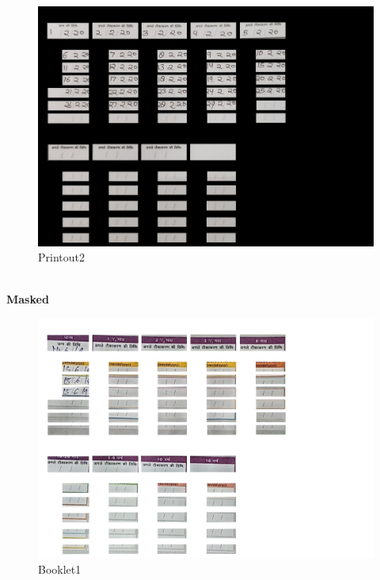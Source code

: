 \documentclass{article}
\begin{document}
    \begin{figure}[!htb]
    \minipage{\textwidth}
    \begin{center}
      \includegraphics[scale=.25]{4/.report/_segmented/_mask/p2.jpg}
      \caption{Printout2}
    \end{center}
    \endminipage
    \end{figure}
\pagebreak \\
\textbf{Masked}
    \begin{figure}[!htb]
    \minipage{\textwidth}
    \begin{center}
      \includegraphics[scale=.25]{4/.report/_segmented/_mask/b1.jpg}
      \caption{Booklet1}
    \end{center}
    \endminipage
    \end{figure}
\end{document}

